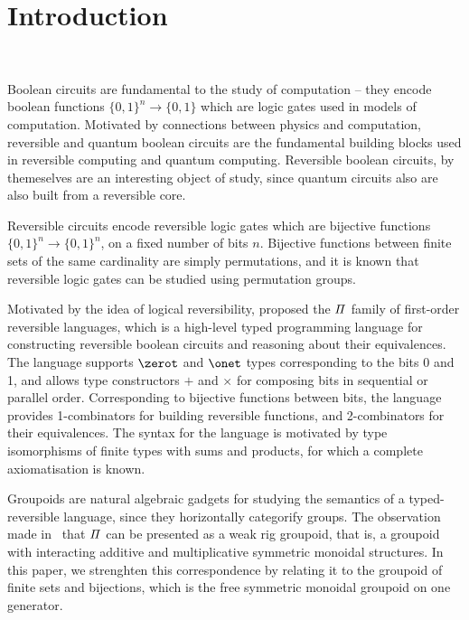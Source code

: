 \section{Introduction}~\label{sec:introduction}

Boolean circuits are fundamental to the study of computation -- they encode boolean functions $\{0,1\}^{n}\to\{0,1\}$
which are logic gates used in models of computation. Motivated by connections between physics and computation,
reversible and quantum boolean circuits are the fundamental building blocks used in reversible computing and quantum
computing. Reversible boolean circuits, by themeselves are an interesting object of study, since quantum circuits also
are also built from a reversible core.

Reversible circuits encode reversible logic gates which are bijective functions $\{0,1\}^{n} \to \{0,1\}^{n}$, on a
fixed number of bits $n$. Bijective functions between finite sets of the same cardinality are simply permutations, and
it is known that reversible logic gates can be studied using permutation groups.

Motivated by the idea of logical reversibility, \citet{jamesInformationEffects2012} proposed the $\mathit{\Pi}$ family of
first-order reversible languages, which is a high-level typed programming language for constructing reversible boolean
circuits and reasoning about their equivalences. The language supports $\zerot$ and $\onet$ types corresponding to the
bits 0 and 1, and allows type constructors $+$ and $\times$ for composing bits in sequential or parallel order.
Corresponding to bijective functions between bits, the language provides 1-combinators for building reversible
functions, and 2-combinators for their equivalences. The syntax for the language is motivated by type isomorphisms of
finite types with sums and products, for which a complete axiomatisation is known.

Groupoids are natural algebraic gadgets for studying the semantics of a typed-reversible language, since they
horizontally categorify groups. The observation made in~\cite{caretteComputingSemiringsWeak2016} that $\mathit{\Pi}$ can be
presented as a weak rig groupoid, that is, a groupoid with interacting additive and multiplicative symmetric monoidal
structures. In this paper, we strenghten this correspondence by relating it to the groupoid of finite sets and
bijections, which is the free symmetric monoidal groupoid on one generator.


